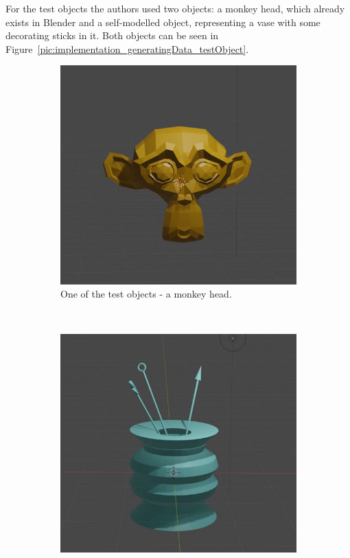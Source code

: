 For the test objects the authors used two objects: a monkey head, which already exists in Blender and a self-modelled object, representing a vase with some decorating sticks in it. Both objects can be seen in Figure~\ref{pic:implementation_generatingData_testObject}.

\begin{figure}[h!]
	\centering
	\begin{subfigure}[t]{0.4\textwidth}
		\centering
		\includegraphics[width=\textwidth]{img/implementation_generatingData_testObject1.jpg}
		\caption{One of the test objects - a monkey head.}
	\end{subfigure}%
	~ 
	\begin{subfigure}[t]{0.4\textwidth}
		\centering
		\includegraphics[width=\textwidth]{img/implementation_generatingData_testObject2.jpg}

\end{subfigure}
\end{figure}
